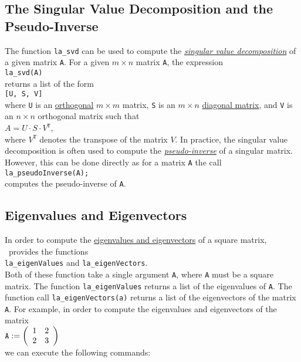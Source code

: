 \subsection{The Singular Value Decomposition and the Pseudo-Inverse}
The function \texttt{la\_svd} can be used to compute the 
\href{http://en.wikipedia.org/wiki/Singular_value_decomposition}{\emph{singular value decomposition}} 
of a given matrix \texttt{A}.  For a given $m \times n$ matrix \texttt{A}, the expression 
\\[0.2cm]
\hspace*{1.3cm}
\texttt{la\_svd(A)}
\\[0.2cm]
returns a list of the form
\\[0.2cm]
\hspace*{1.3cm}
\texttt{[U, S, V]}
\\[0.2cm]
where \texttt{U} is an 
\href{http://en.wikipedia.org/wiki/Orthogonal_matrix}{orthogonal} $m \times m$ matrix, \texttt{S}
is an $m \times n$ 
\href{http://en.wikipedia.org/wiki/Diagonal_matrix}{diagonal matrix}, and \texttt{V} is an $n \times n$
orthogonal matrix such that
\\[0.2cm]
\hspace*{1.3cm}
$A = U \cdot S \cdot V^{\mathtt{T}}$,
\\[0.2cm]
where $V^{\mathtt{T}}$ denotes the transpose of the matrix $V$.
  In practice, the singular value decomposition is often used to compute the
\href{http://en.wikipedia.org/wiki/Moore-Penrose_pseudoinverse}{\emph{pseudo-inverse}}
 of a singular matrix.   However, this can be done directly as for a matrix \texttt{A} the call
\\[0.2cm]
\hspace*{1.3cm}
\texttt{la\_pseudoInverse(A);}
\\[0.2cm]
computes the pseudo-inverse of \texttt{A}.

\subsection{Eigenvalues and Eigenvectors}
In order to compute the 
\href{http://en.wikipedia.org/wiki/Eigenvalues_and_eigenvectors}{eigenvalues and eigenvectors} of a
square matrix, \setlx\ provides the functions
\\[0.2cm]
\hspace*{1.3cm}
\texttt{la\_eigenValues} \quad and \quad \texttt{la\_eigenVectors}.
\\[0.2cm]
Both of these function take a single argument \texttt{A}, where \texttt{A} must be a square matrix.
The function \texttt{la\_eigenValues} returns a list of the eigenvalues of \texttt{A}.  The
function call \texttt{la\_eigenVectors(a)} returns a list of the eigenvectors of the matrix \texttt{A}.
For example, in order to compute the eigenvalues and eigenvectors of the matrix
\\[0.2cm]
\hspace*{1.3cm}
$\mathtt{A} :=
\left(\begin{array}[c]{ll}
  1 & 2 \\
  2 & 3
\end{array}\right)
$
\\[0.2cm]
we can execute the following commands:

